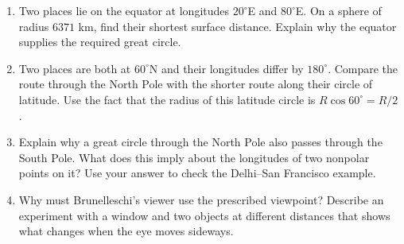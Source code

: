 \begin{enumerate}
\item Two places lie on the equator at longitudes $20^\circ$E and
$80^\circ$E. On a sphere of radius $6371$ km, find their shortest surface
distance. Explain why the equator supplies the required great circle.
\item Two places are both at $60^\circ$N and their longitudes differ by
$180^\circ$. Compare the route through the North Pole with the shorter
route along their circle of latitude. Use the fact that the radius of this
latitude circle is $R\cos60^\circ=R/2$.
\item Explain why a great circle through the North Pole also passes through
the South Pole. What does this imply about the longitudes of two nonpolar
points on it? Use your answer to check the Delhi--San Francisco example.
\item Why must Brunelleschi's viewer use the prescribed viewpoint? Describe
an experiment with a window and two objects at different distances that
shows what changes when the eye moves sideways.

\end{enumerate}
